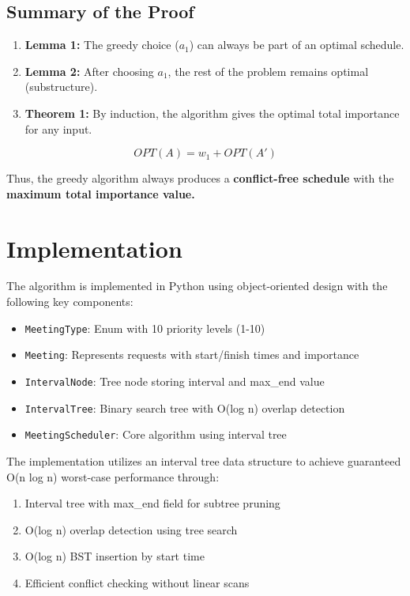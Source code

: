 \documentclass[conference]{IEEEtran}
\begin{document}
\subsection{Summary of the Proof}

\begin{enumerate}
    \item \textbf{Lemma 1:} The greedy choice (\( a_1 \)) can always be part of an optimal schedule.
    \item \textbf{Lemma 2:} After choosing \( a_1 \), the rest of the problem remains optimal (substructure).
    \item \textbf{Theorem 1:} By induction, the algorithm gives the optimal total importance for any input.
\end{enumerate}

\[
OPT(A) = w_1 + OPT(A')
\]

Thus, the greedy algorithm always produces a \textbf{conflict-free schedule} with the \textbf{maximum total importance value.}


\section{Implementation}

The algorithm is implemented in Python using object-oriented design with the following key components:

\begin{itemize}
    \item \texttt{MeetingType}: Enum with 10 priority levels (1-10)
    \item \texttt{Meeting}: Represents requests with start/finish times and importance
    \item \texttt{IntervalNode}: Tree node storing interval and max\_end value
    \item \texttt{IntervalTree}: Binary search tree with O(log n) overlap detection
    \item \texttt{MeetingScheduler}: Core algorithm using interval tree
\end{itemize}

The implementation utilizes an interval tree data structure to achieve guaranteed O(n log n) worst-case performance through:
\begin{enumerate}
    \item Interval tree with max\_end field for subtree pruning
    \item O(log n) overlap detection using tree search
    \item O(log n) BST insertion by start time
    \item Efficient conflict checking without linear scans
\end{enumerate}
\end{document}
